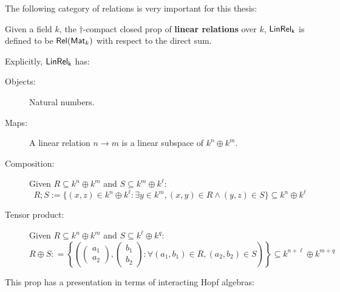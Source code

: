 %
%
%
%
%
The following category of relations is very important for this thesis:
\begin{definition}
Given a field $k$, the $\dag$-compact closed prop of {\bf linear relations} over $k$, $\sf LinRel_{k}$ is defined to be $\mathsf{Rel}(\mathsf{Mat}_k)$ with respect to the direct sum.

Explicitly, $\sf LinRel_{k}$ has:
\begin{description}
\item[Objects:] Natural numbers.
\item[Maps:] A linear relation $n\to m$ is a linear subspace of $k^n \oplus k^m$.
\item[Composition:]  Given $R \subseteq k^n \oplus k^m$  and $S \subseteq k^m \oplus k^\ell$:
$$
R;S := \{  (x,z) \in k^{n} \oplus k^{\ell} : \exists y \in k^{m}, (x,y) \in R \wedge (y,z) \in S \} \subseteq k^n \oplus k^\ell
$$ 
\item[Tensor product:] Given $R \subseteq k^n \oplus k^m$ and $S \subseteq k^\ell \oplus k^q$:
$$R\oplus S : =
\left\{
\left(
\begin{pmatrix}
a_1\\a_2
\end{pmatrix},
\begin{pmatrix}
b_1\\b_2
\end{pmatrix}
:
\forall (a_1,b_1) \in R, (a_2,b_2) \in S
\right)
\right\} \subseteq k^{n+\ell}\oplus k^{m+q}
$$
\end{description}
\end{definition}
This prop has a presentation in terms of interacting Hopf algebras:
